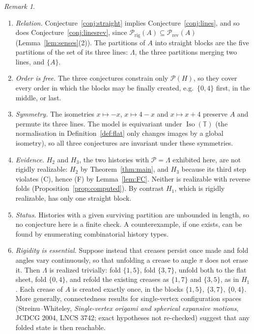 \documentclass[11pt]{amsart}
\theoremstyle{definition}
\theoremstyle{remark}
\newtheorem{remark}[theorem]{Remark}
\newcommand{\T}{\mathbb{T}}
\newcommand{\Iso}{\operatorname{Iso}}
\newcommand{\Prig}{\mathcal{P}_{\mathrm{rig}}}
\newcommand{\Prev}{\mathcal{P}_{\mathrm{rev}}}
\newcommand{\Surv}{\mathcal{P}}
\begin{document}
\begin{remark}\label{rem:conj}\leavevmode
\begin{enumerate}[label=(\arabic*),leftmargin=*]
\item \emph{Relation.} Conjecture~\ref{conj:straight} implies Conjecture~\ref{conj:lines}, and so does
Conjecture~\ref{conj:linesrev}, since $\Prig(A)\subseteq\Prev(A)$ (Lemma~\ref{lem:senses}(2)). The
partitions of $A$ into straight blocks are the five partitions of the set of its three lines:
$\Lambda$, the three partitions merging two lines, and $\{A\}$.
\item \emph{Order is free.} The three conjectures constrain only $\Surv(H)$, so they cover every order
in which the blocks may be finally created, e.g.\ $\{0,4\}$ first, in the middle, or last.
\item \emph{Symmetry.} The isometries $x\mapsto -x$, $x\mapsto 4-x$ and $x\mapsto x+4$ preserve
$A$ and permute its three lines. The model is equivariant under $\Iso(\T)$ (the normalisation
in Definition~\ref{def:flat} only changes images by a global isometry), so all three conjectures are
invariant under these symmetries.
\item \emph{Evidence.} $H_2$ and $H_3$, the two histories with $\Surv=\Lambda$ exhibited here,
are not rigidly realizable: $H_2$ by Theorem~\ref{thm:main}, and $H_3$ because its third step
violates (C), hence (F) by Lemma~\ref{lem:FC}. Neither is realizable with reverse folds
(Proposition~\ref{prop:computed}). By contrast $H_1$, which is rigidly realizable, has only one
straight block.
\item \emph{Status.} Histories with a given surviving partition are unbounded in length, so
no conjecture here is a finite check. A counterexample, if one exists, can be found by
enumerating combinatorial history types.
\item \emph{Rigidity is essential.} Suppose instead that creases persist once made and fold angles
vary continuously, so that unfolding a crease to angle $\pi$ does not erase it. Then $\Lambda$
is realized trivially: fold $\{1,5\}$, fold $\{3,7\}$, unfold both to the flat sheet, fold
$\{0,4\}$, and refold the existing creases as $\{1,7\}$ and $\{3,5\}$, as in $H_1$. Each crease
of $A$ is created exactly once, in the blocks $\{1,5\}$, $\{3,7\}$, $\{0,4\}$. More generally,
connectedness results for single-vertex configuration spaces (Streinu--Whiteley,
\emph{Single-vertex origami and spherical expansive motions}, JCDCG 2004, LNCS 3742; exact
hypotheses not re-checked) suggest that any folded state is then reachable.
\end{enumerate}
\end{remark}
\end{document}
